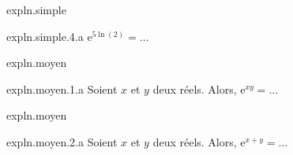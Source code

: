 \begin{qcm}{expln.simple}
    \begin{question}{expln.simple.4.a}
         \(\mathrm{e}^{5\ln(2)}=\ldots\)
         \vspace{-1.5ex}
         \begin{multicols}{3}
         \begin{reponses}
         \end{reponses}
         \end{multicols}
    \end{question}
\end{qcm}



\begin{qcm}{expln.moyen}
    \begin{question}{expln.moyen.1.a}
         Soient \(x\) et \(y\) deux réels. Alors, \(\mathrm{e}^{xy}=\ldots\)
         \vspace{-1.5ex}
         \begin{multicols}{2}
         \begin{reponses}
            \lastchoices
         \end{reponses}
         \end{multicols}
    \end{question}
\end{qcm}


\begin{qcm}{expln.moyen}
    \begin{question}{expln.moyen.2.a}
         Soient \(x\) et \(y\) deux réels. Alors, \(\mathrm{e}^{x+y}=\ldots\)
         \vspace{-1.5ex}
         \begin{multicols}{2}
         \begin{reponses}
            \lastchoices
         \end{reponses}
         \end{multicols}
    \end{question}
\end{qcm}


